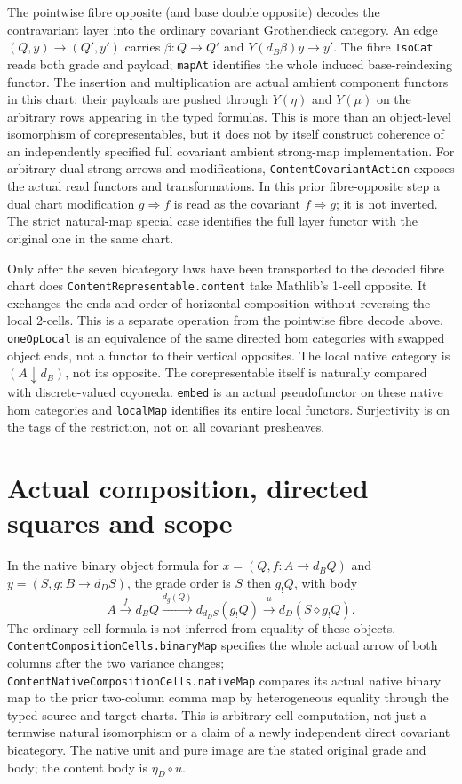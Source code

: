 \documentclass[11pt]{article}
\newcommand{\nm}[1]{\nolinkurl{#1}}
\begin{document}
The pointwise fibre opposite (and base double opposite) decodes the
contravariant layer into the ordinary covariant Grothendieck category.
An edge $(Q,y)\to(Q',y')$ carries
$\beta:Q\to Q'$ and $Y(d_B\beta)y\to y'$. The fibre
\nm{IsoCat} reads both grade and payload; \nm{mapAt} identifies the
whole induced base-reindexing functor. The insertion and multiplication
are actual ambient component functors in this chart: their payloads
are pushed through $Y(\eta)$ and $Y(\mu)$ on the arbitrary rows
appearing in the typed formulas. This is more than an object-level
isomorphism of corepresentables, but it does not by itself construct
coherence of an independently specified full covariant ambient
strong-map implementation. For arbitrary dual strong arrows and
modifications, \nm{ContentCovariantAction} exposes the actual
read functors and transformations. In this prior fibre-opposite step
a dual chart modification $g\Rightarrow f$ is read as
the covariant $f\Rightarrow g$; it is not inverted.
The strict natural-map special case identifies the full layer functor
with the original one in the same chart.

Only after the seven bicategory laws have been transported to the
decoded fibre chart does \nm{ContentRepresentable.content} take
Mathlib's 1-cell opposite. It exchanges the ends and order of
horizontal composition without reversing the local 2-cells. This is
a separate operation from the pointwise fibre decode above.
\nm{oneOpLocal} is an equivalence of the same directed hom categories
with swapped object ends, not a functor to their vertical opposites.
The local native category is $(A\downarrow d_B)$, not its opposite.
The corepresentable itself is naturally compared with discrete-valued
coyoneda. \nm{embed} is an actual pseudofunctor on these native
hom categories and \nm{localMap} identifies its entire local
functors. Surjectivity is on the tags of the restriction, not on all
covariant presheaves.

\section*{Actual composition, directed squares and scope}
In the native binary object formula for
$x=(Q,f:A\to d_B Q)$ and $y=(S,g:B\to d_D S)$, the grade order is
$S$ then $g_!Q$, with body
\[
  A\xrightarrow{f} d_B Q\xrightarrow{d_g(Q)} d_{d_D S}(g_!Q)
    \xrightarrow{\mu} d_D(S\diamond g_!Q).
\]
The ordinary cell formula is not inferred from equality of these
objects. \nm{ContentCompositionCells.binaryMap} specifies the
whole actual arrow of both columns after the two variance changes;
\nm{ContentNativeCompositionCells.nativeMap} compares its actual
native binary map to the prior two-column comma map by heterogeneous
equality through the typed source and target charts. This is
arbitrary-cell computation, not just a termwise natural isomorphism
or a claim of a newly independent direct covariant bicategory.
The native unit and pure image are the stated original grade and
body; the content body is $\eta_D\circ u$.
\end{document}
